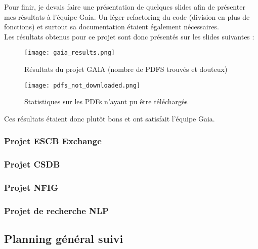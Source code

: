 Pour finir, je devais faire une présentation de quelques slides afin de présenter mes résultats à l'équipe Gaia.
Un léger refactoring du code (division en plus de fonctions) et surtout sa documentation étaient également nécessaires. 
\\
Les résultats obtenus pour ce projet sont donc présentés sur les slides suivantes :

\begin{figure}[H]
    \centering
    \texttt{[image: gaia\_results.png]}
    \caption{Résultats du projet GAIA (nombre de PDFS trouvés et douteux)}
\end{figure}

\begin{figure}[H]
    \centering
    \texttt{[image: pdfs\_not\_downloaded.png]}
    \caption{Statistiques sur les PDFs n'ayant pu être téléchargés}
\end{figure}

Ces résultats étaient donc plutôt bons et ont satisfait l'équipe Gaia.
 
\subsubsection{Projet ESCB Exchange}

\subsubsection{Projet CSDB}

\subsubsection{Projet NFIG}

\subsubsection{Projet de recherche NLP}

\subsection{Planning général suivi}